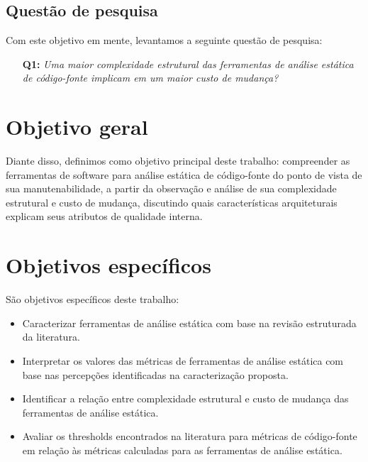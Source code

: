 \subsection{Questão de pesquisa}

Com este objetivo em mente, levantamos a seguinte questão de pesquisa:

\begin{enumerate}
  \item [{\bf Q1:}] {\em Uma maior complexidade estrutural das ferramentas de
  análise estática de código-fonte implicam em um maior custo de mudança?}
\end{enumerate}

\section{Objetivo geral}

Diante disso, definimos como objetivo principal deste trabalho: compreender
as ferramentas de software para análise estática de código-fonte do ponto de
vista de sua manutenabilidade, a partir da observação e análise de sua complexidade
estrutural e custo de mudança, discutindo quais características arquiteturais
explicam seus atributos de qualidade interna.

\section{Objetivos específicos}

São objetivos específicos deste trabalho:

\begin{itemize}
  \item Caracterizar ferramentas de análise estática com base na revisão
        estruturada da literatura.
  \item Interpretar os valores das métricas de ferramentas de análise estática
        com base nas percepções identificadas na caracterização proposta.
  \item Identificar a relação entre complexidade estrutural e custo de mudança 
        das ferramentas de análise estática.
  \item Avaliar os thresholds encontrados na literatura para métricas de
        código-fonte em relação às métricas calculadas para as ferramentas
        de análise estática.
\end{itemize}

